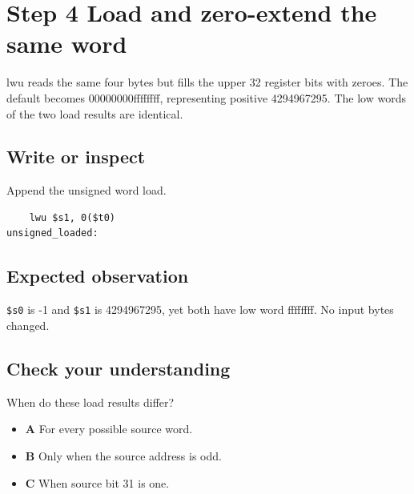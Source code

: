 \section{Step 4 Load and zero-extend the same
  word}\label{004-bit-inspector-s04-step-4-load-and-zero-extend-the-same-word}

lwu reads the same four bytes but fills the upper 32 register bits with
zeroes. The default becomes 00000000ffffffff, representing positive
4294967295. The low words of the two load results are identical.

\subsection{Write or
  inspect}\label{004-bit-inspector-s04-write-or-inspect}

Append the unsigned word load.

\begin{verbatim}
    lwu $s1, 0($t0)
unsigned_loaded:
\end{verbatim}

\subsection{Expected
  observation}\label{004-bit-inspector-s04-expected-observation}

\texttt{\$s0} is -1 and \texttt{\$s1} is 4294967295, yet both have low
word ffffffff. No input bytes changed.

\subsection{Check your
  understanding}\label{004-bit-inspector-s04-check-your-understanding}

When do these load results differ?

\begin{itemize}
  \tightlist
  \item
        \textbf{A} For every possible source word.
  \item
        \textbf{B} Only when the source address is odd.
  \item
        \textbf{C} When source bit 31 is one.
\end{itemize}
